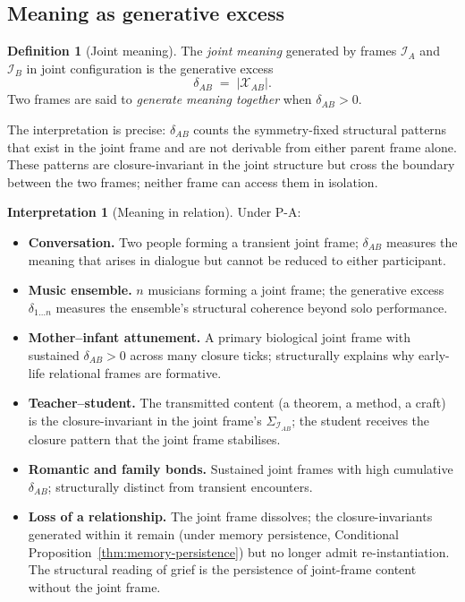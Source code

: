 \documentclass[11pt]{article}
\theoremstyle{plain}
\theoremstyle{definition}
\newtheorem{definition}[theorem]{Definition}
\newtheorem{interpretation}[theorem]{Interpretation}
\theoremstyle{remark}
\newcommand{\Ical}{\mathcal{I}}
\newcommand{\Xcal}{\mathcal{X}}
\begin{document}
\subsection{Meaning as generative excess}

\begin{definition}[Joint meaning]\label{def:joint-meaning}
The \emph{joint meaning} generated by frames $\Ical_A$ and $\Ical_B$ in joint configuration is the generative excess
\[
  \delta_{AB} \;=\; |\Xcal_{AB}|.
\]
Two frames are said to \emph{generate meaning together} when $\delta_{AB} > 0$.
\end{definition}

The interpretation is precise: $\delta_{AB}$ counts the symmetry-fixed structural patterns that exist in the joint frame and are not derivable from either parent frame alone. These patterns are closure-invariant in the joint structure but cross the boundary between the two frames; neither frame can access them in isolation.

\begin{interpretation}[Meaning in relation]\label{int:joint-meaning}
Under P-A:
\begin{itemize}[leftmargin=2em]
\item \textbf{Conversation.} Two people forming a transient joint frame; $\delta_{AB}$ measures the meaning that arises in dialogue but cannot be reduced to either participant.
\item \textbf{Music ensemble.} $n$ musicians forming a joint frame; the generative excess $\delta_{1\ldots n}$ measures the ensemble's structural coherence beyond solo performance.
\item \textbf{Mother--infant attunement.} A primary biological joint frame with sustained $\delta_{AB} > 0$ across many closure ticks; structurally explains why early-life relational frames are formative.
\item \textbf{Teacher--student.} The transmitted content (a theorem, a method, a craft) is the closure-invariant in the joint frame's $\Sigma_{\Ical_{AB}}$; the student receives the closure pattern that the joint frame stabilises.
\item \textbf{Romantic and family bonds.} Sustained joint frames with high cumulative $\delta_{AB}$; structurally distinct from transient encounters.
\item \textbf{Loss of a relationship.} The joint frame dissolves; the closure-invariants generated within it remain (under memory persistence, Conditional Proposition~\ref{thm:memory-persistence}) but no longer admit re-instantiation. The structural reading of grief is the persistence of joint-frame content without the joint frame.
\end{itemize}
\end{interpretation}
\end{document}
